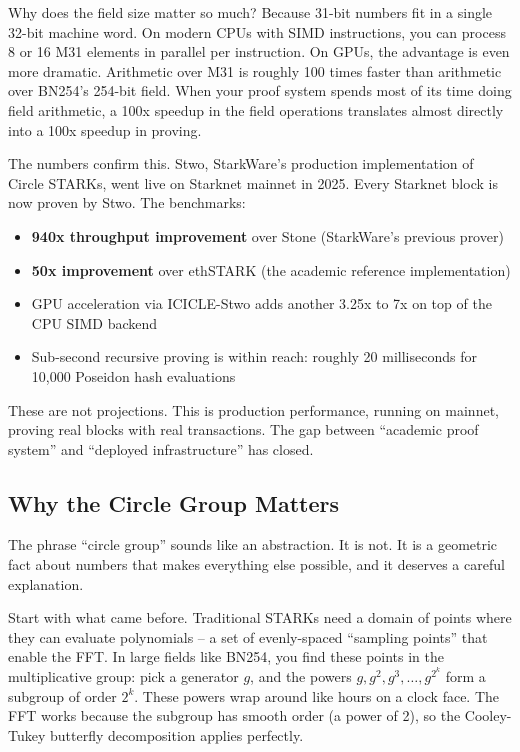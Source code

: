 \documentclass[
  11pt,
  openany]{report}
\providecommand{\tightlist}{%
  \setlength{\itemsep}{0pt}\setlength{\parskip}{0pt}}
\renewcommand{\textbf}[1]{{\bfseries\color{MidnightBold}#1}}
\begin{document}
Why does the field size matter so much? Because 31-bit numbers fit in a single
32-bit machine word. On modern CPUs with SIMD instructions, you can process 8 or
16 M31 elements in parallel per instruction. On GPUs, the advantage is even more
dramatic. Arithmetic over M31 is roughly 100 times faster than arithmetic over
BN254's 254-bit field. When your proof system spends most of its time doing
field arithmetic, a 100x speedup in the field operations translates almost
directly into a 100x speedup in proving.

The numbers confirm this. Stwo, StarkWare's production implementation of Circle
STARKs, went live on Starknet mainnet in 2025. Every Starknet block is now
proven by Stwo. The benchmarks:

\begin{itemize}
\tightlist
\item
  \textbf{940x throughput improvement} over Stone (StarkWare's previous prover)
\item
  \textbf{50x improvement} over ethSTARK (the academic reference implementation)
\item
  GPU acceleration via ICICLE-Stwo adds another 3.25x to 7x on top of the CPU
  SIMD backend
\item
  Sub-second recursive proving is within reach: roughly 20 milliseconds for
  10,000 Poseidon hash evaluations
\end{itemize}

These are not projections. This is production performance, running on mainnet,
proving real blocks with real transactions. The gap between ``academic proof
system'' and ``deployed infrastructure'' has closed.

\subsection{Why the Circle Group Matters}\label{why-the-circle-group-matters}

The phrase ``circle group'' sounds like an abstraction. It is not. It is a
geometric fact about numbers that makes everything else possible, and it
deserves a careful explanation.

Start with what came before. Traditional STARKs need a domain of points where
they can evaluate polynomials -- a set of evenly-spaced ``sampling points'' that
enable the FFT. In large fields like BN254, you find these points in the
multiplicative group: pick a generator \(g\), and the powers
\(g, g^2, g^3, \ldots, g^{2^k}\) form a subgroup of order \(2^k\). These powers
wrap around like hours on a clock face. The FFT works because the subgroup has
smooth order (a power of 2), so the Cooley-Tukey butterfly decomposition applies
perfectly.
\end{document}
